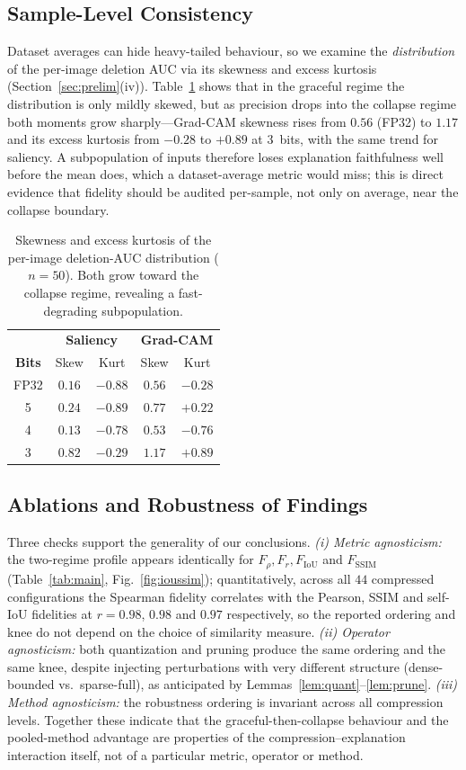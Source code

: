\subsection{Sample-Level Consistency}
\label{sec:samplelevel}
Dataset averages can hide heavy-tailed behaviour, so we examine the
\emph{distribution} of the per-image deletion AUC via its skewness and excess
kurtosis (Section~\ref{sec:prelim}(iv)). Table~\ref{tab:skew} shows that in the
graceful regime the distribution is only mildly skewed, but as precision drops
into the collapse regime both moments grow sharply---Grad-CAM skewness rises from
$0.56$ (FP32) to $1.17$ and its excess kurtosis from $-0.28$ to $+0.89$ at
$3$~bits, with the same trend for saliency. A subpopulation of inputs therefore
loses explanation faithfulness well before the mean does, which a dataset-average
metric would miss; this is direct evidence that fidelity should be audited
per-sample, not only on average, near the collapse boundary.

\begin{table}[!t]
\caption{Skewness and excess kurtosis of the per-image deletion-AUC distribution
($n=50$). Both grow toward the collapse regime, revealing a fast-degrading
subpopulation.}
\label{tab:skew}
\centering
\begin{tabular}{c c c c c}
\hline
& \multicolumn{2}{c}{\textbf{Saliency}} & \multicolumn{2}{c}{\textbf{Grad-CAM}}\\
\textbf{Bits} & Skew & Kurt & Skew & Kurt\\
\hline
FP32 & $0.16$ & $-0.88$ & $0.56$ & $-0.28$\\
5 & $0.24$ & $-0.89$ & $0.77$ & $+0.22$\\
4 & $0.13$ & $-0.78$ & $0.53$ & $-0.76$\\
3 & $0.82$ & $-0.29$ & $1.17$ & $+0.89$\\
\hline
\end{tabular}
\end{table}

\subsection{Ablations and Robustness of Findings}
Three checks support the generality of our conclusions. \emph{(i) Metric
agnosticism:} the two-regime profile appears identically for
$F_\rho,F_r,F_{\mathrm{IoU}}$ and $F_{\mathrm{SSIM}}$
(Table~\ref{tab:main}, Fig.~\ref{fig:ioussim}); quantitatively, across all $44$
compressed configurations the Spearman fidelity correlates with the Pearson,
SSIM and self-IoU fidelities at $r=0.98$, $0.98$ and $0.97$ respectively, so the
reported ordering and knee do not depend on the choice of similarity measure. \emph{(ii) Operator
agnosticism:} both quantization and pruning produce the same ordering and the
same knee, despite injecting perturbations with very different structure
(dense-bounded vs.\ sparse-full), as anticipated by
Lemmas~\ref{lem:quant}--\ref{lem:prune}. \emph{(iii) Method agnosticism:} the
robustness ordering is invariant across all compression levels. Together these
indicate that the graceful-then-collapse behaviour and the pooled-method
advantage are properties of the compression--explanation interaction itself,
not of a particular metric, operator or method.

